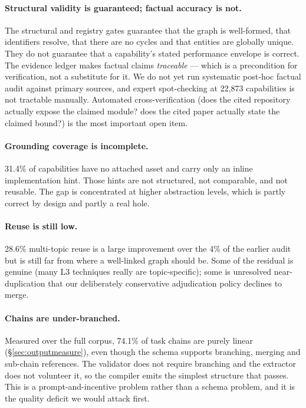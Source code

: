 \documentclass[10pt,a4paper]{article}
\begin{document}
\paragraph{Structural validity is guaranteed; factual accuracy is not.} The
structural and registry gates guarantee that the graph is well-formed, that identifiers resolve, that there are
no cycles and that entities are globally unique. They do not guarantee that a
capability's stated performance envelope is correct. The evidence ledger makes
factual claims \emph{traceable} --- which is a precondition for verification, not
a substitute for it. We do not yet run systematic post-hoc factual audit against
primary sources, and expert spot-checking at 22{,}873 capabilities is not
tractable manually. Automated cross-verification (does the cited repository
actually expose the claimed module? does the cited paper actually state the
claimed bound?) is the most important open item.

\paragraph{Grounding coverage is incomplete.} 31.4\% of capabilities have no
attached asset and carry only an inline implementation hint. Those hints are not
structured, not comparable, and not reusable. The gap is concentrated at higher
abstraction levels, which is partly correct by design and partly a real hole.

\paragraph{Reuse is still low.} 28.6\% multi-topic reuse is a large improvement
over the 4\% of the earlier audit but is still far from where a well-linked graph
should be. Some of the residual is genuine (many L3 techniques really are
topic-specific); some is unresolved near-duplication that our deliberately
conservative adjudication policy declines to merge.

\paragraph{Chains are under-branched.} Measured over the full corpus,
74.1\% of task chains are purely linear (\S\ref{sec:outputmeasure}), even though
the schema supports branching, merging and sub-chain references. The validator
does not require branching and the extractor does not volunteer it, so the
compiler emits the simplest structure that passes. This is a
prompt-and-incentive problem rather than a schema problem, and it is the quality
deficit we would attack first.
\end{document}
